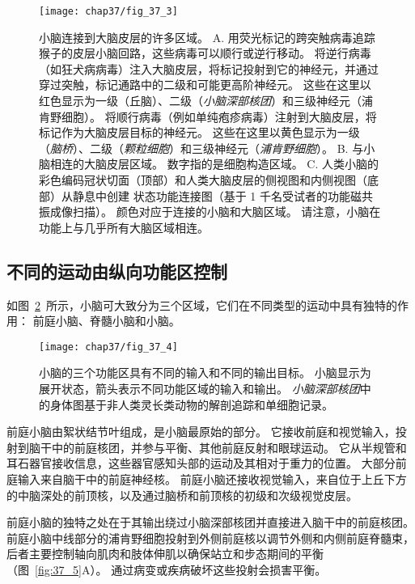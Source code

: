 \begin{figure}[htbp]
	\centering
	\texttt{[image: chap37/fig\_37\_3]}
	\caption{小脑连接到大脑皮层的许多区域\cite{bostan2013cerebellar}。
		A. 用荧光标记的跨突触病毒追踪猴子的皮层小脑回路，这些病毒可以顺行或逆行移动。
		将逆行病毒（如狂犬病病毒）注入大脑皮层，将标记投射到它的神经元，并通过穿过突触，标记通路中的二级和可能更高阶神经元。
		这些在这里以红色显示为一级（丘脑）、二级（\textit{小脑深部核团}）和三级神经元（浦肯野细胞）。
		将顺行病毒（例如单纯疱疹病毒）注射到大脑皮层，将标记作为大脑皮层目标的神经元。
		这些在这里以黄色显示为一级（\textit{脑桥}）、二级（\textit{颗粒细胞}）和三级神经元（\textit{浦肯野细胞}）。
		B. 与小脑相连的大脑皮层区域。 数字指的是细胞构造区域。
		C. 人类小脑的彩色编码冠状切面（顶部）和人类大脑皮层的侧视图和内侧视图（底部）从静息中创建 状态功能连接图（基于 1 千名受试者的功能磁共振成像扫描）。
		颜色对应于连接的小脑和大脑区域。
		请注意，小脑在功能上与几乎所有大脑区域相连。}
	\label{fig:37_3}
\end{figure}



\subsection{不同的运动由纵向功能区控制}

如图~\ref{fig:37_4}~所示，小脑可大致分为三个区域，它们在不同类型的运动中具有独特的作用：
前庭小脑、脊髓小脑和小脑。


\begin{figure}[htbp]
	\centering
	\texttt{[image: chap37/fig\_37\_4]}
	\caption{小脑的三个功能区具有不同的输入和不同的输出目标。
		小脑显示为展开状态，箭头表示不同功能区域的输入和输出。
		\textit{小脑深部核团}中的身体图基于非人类灵长类动物的解剖追踪和单细胞记录\cite{brooks1981handbook}。}
	\label{fig:37_4}
\end{figure}


前庭小脑由絮状结节叶组成，是小脑最原始的部分。
它接收前庭和视觉输入，投射到脑干中的前庭核团，并参与平衡、其他前庭反射和眼球运动。
它从半规管和耳石器官接收信息，这些器官感知头部的运动及其相对于重力的位置。
大部分前庭输入来自脑干中的前庭神经核。
前庭小脑还接收视觉输入，来自位于上丘下方的中脑深处的前顶核，以及通过脑桥和前顶核的初级和次级视觉皮层。


前庭小脑的独特之处在于其输出绕过小脑深部核团并直接进入脑干中的前庭核团。
前庭小脑中线部分的浦肯野细胞投射到外侧前庭核以调节外侧和内侧前庭脊髓束，后者主要控制轴向肌肉和肢体伸肌以确保站立和步态期间的平衡（图~\ref{fig:37_5}A）。
通过病变或疾病破坏这些投射会损害平衡。


